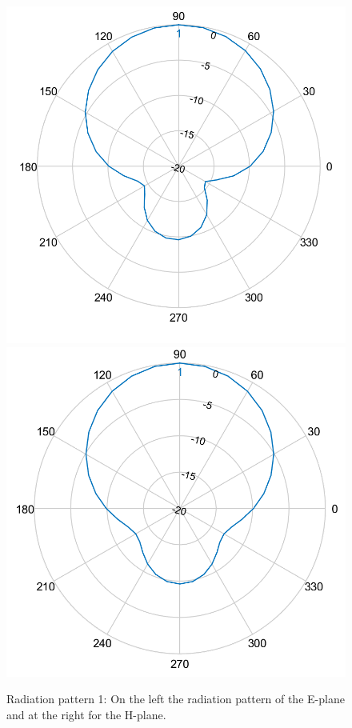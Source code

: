\documentclass[twocolumn]{phdsymp} %
\begin{document}
\begin{figure}[!htb]
  \includegraphics[width=\linewidth]{pattern2/ep.png} 
\endminipage\hfill
{}%
  \includegraphics[width=\linewidth]{pattern2/hp.png}
\endminipage
  \caption{Radiation pattern 1: On the left the radiation pattern of the E-plane and at the right for the H-plane.}
\label{fig:radpattern}
\end{figure}
\end{document}

